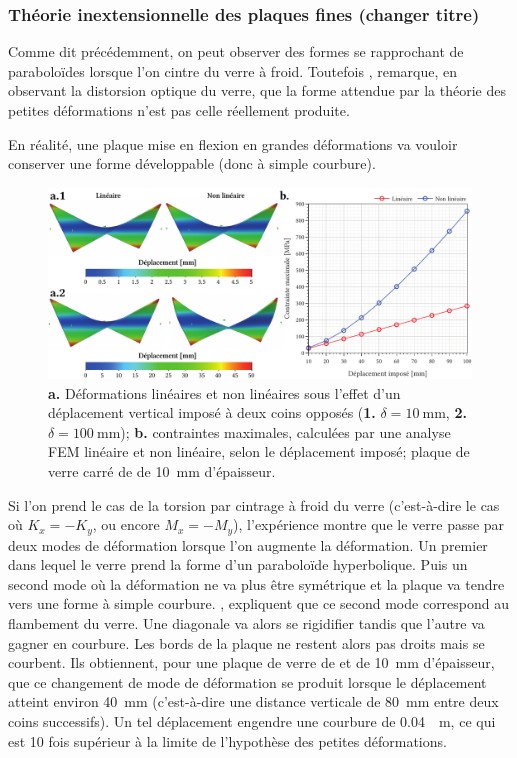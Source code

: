 \documentclass[11pt,titlepage]{article}
\begin{document}
\subsubsection{Théorie inextensionnelle des plaques fines (changer titre)}

Comme dit précédemment, on peut observer des formes se rapprochant de paraboloïdes lorsque l'on cintre du verre à froid. Toutefois \Textcite{staaks}, remarque, en observant la distorsion optique du verre, que la forme attendue par la théorie des petites déformations n'est pas celle réellement produite.

En réalité, une plaque mise en flexion en grandes déformations va vouloir conserver une forme développable (donc à simple courbure). 
\begin{figure}[H]
    \includegraphics[width=\linewidth]{img/cintrage_froid/non_linear2.pdf}
       \caption{\textbf{a.} Déformations linéaires et non linéaires sous l'effet d'un déplacement vertical imposé à deux coins opposés (\textbf{1.} $\delta = \qty{10}{\milli\metre}$, \textbf{2.} $\delta = \qty{100}{\milli\metre}$); \textbf{b.} contraintes maximales, calculées par une analyse FEM linéaire et non linéaire, selon le déplacement imposé; plaque de verre carré de  de \qty{10}{\milli\metre} d'épaisseur.}
   \label{fig:non_linear_cintr2}
   \end{figure}

Si l'on prend le cas de la torsion par cintrage à froid du verre (c'est-à-dire le cas où $K_x = -K_y$, ou encore $M_x = -M_y$), l'expérience montre que le verre passe par deux modes de déformation lorsque l'on augmente la déformation. Un premier dans lequel le verre prend la forme d'un paraboloïde hyperbolique. Puis un second mode où la déformation ne va plus être symétrique et la plaque va tendre vers une forme à simple courbure. \Textcite{buckling_cold}, expliquent que ce second mode correspond au flambement du verre. Une diagonale va alors se rigidifier tandis que l'autre va gagner en courbure. Les bords de la plaque ne restent alors pas droits mais se courbent. Ils obtiennent, pour une plaque de verre de  et de \qty{10}{\milli\metre} d'épaisseur, que ce changement de mode de déformation se produit lorsque le déplacement atteint environ \qty{40}{\milli\metre} (c'est-à-dire une distance verticale de \qty{80}{\milli\metre} entre deux coins successifs). Un tel déplacement engendre une courbure de \qty{0.04}{\per\metre}, ce qui est 10 fois supérieur à la limite de l'hypothèse des petites déformations. 
\end{document}
